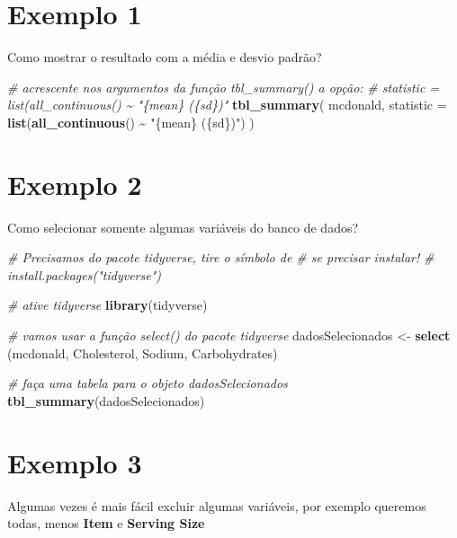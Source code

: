 \documentclass[
]{book}
\newenvironment{Shaded}{\begin{snugshade}}{\end{snugshade}}
\newcommand{\AttributeTok}[1]{\textcolor[rgb]{0.13,0.29,0.53}{#1}}
\newcommand{\CommentTok}[1]{\textcolor[rgb]{0.56,0.35,0.01}{\textit{#1}}}
\newcommand{\FunctionTok}[1]{\textcolor[rgb]{0.13,0.29,0.53}{\textbf{#1}}}
\newcommand{\NormalTok}[1]{#1}
\newcommand{\OtherTok}[1]{\textcolor[rgb]{0.56,0.35,0.01}{#1}}
\newcommand{\SpecialCharTok}[1]{\textcolor[rgb]{0.81,0.36,0.00}{\textbf{#1}}}
\newcommand{\StringTok}[1]{\textcolor[rgb]{0.31,0.60,0.02}{#1}}
\begin{document}
\section{Exemplo 1}\label{exemplo-1-2}

Como mostrar o resultado com a média e desvio padrão?

\begin{Shaded}
\begin{Highlighting}[]
\CommentTok{\# acrescente nos argumentos da função tbl\_summary() a opção:}
\CommentTok{\# statistic = list(all\_continuous() \textasciitilde{} "\{mean\} (\{sd\})"}
\FunctionTok{tbl\_summary}\NormalTok{(}
\NormalTok{            mcdonald, }
            \AttributeTok{statistic =} \FunctionTok{list}\NormalTok{(}\FunctionTok{all\_continuous}\NormalTok{() }\SpecialCharTok{\textasciitilde{}} \StringTok{"\{mean\} (\{sd\})"}\NormalTok{)}
\NormalTok{            )}
\end{Highlighting}
\end{Shaded}

\section{Exemplo 2}\label{exemplo-2-2}

Como selecionar somente algumas variáveis do banco de dados?

\begin{Shaded}
\begin{Highlighting}[]
\CommentTok{\# Precisamos do pacote tidyverse, tire o símbolo de \# se precisar instalar!}
\CommentTok{\# install.packages("tidyverse")}

\CommentTok{\# ative tidyverse}
\FunctionTok{library}\NormalTok{(tidyverse)}

\CommentTok{\# vamos usar a função select() do pacote tidyverse}
\NormalTok{dadosSelecionados }\OtherTok{\textless{}{-}} \FunctionTok{select}\NormalTok{ (mcdonald, Cholesterol, Sodium, Carbohydrates)}

\CommentTok{\# faça uma tabela para o objeto dadosSelecionados}
\FunctionTok{tbl\_summary}\NormalTok{(dadosSelecionados)}
\end{Highlighting}
\end{Shaded}

\section{Exemplo 3}\label{exemplo-3-2}

Algumas vezes é mais fácil excluir algumas variáveis, por exemplo queremos todas, menos \textbf{Item} e \textbf{Serving Size}
\end{document}
